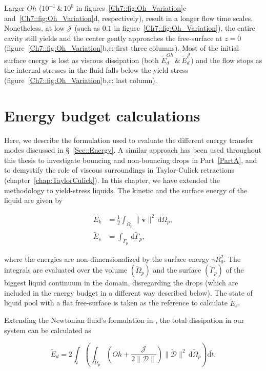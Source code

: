 \begin{subappendices}
Larger $Oh$ ($10^{-1}\,\&\,10^{0}$ in figures~\ref{Ch7::fig:Oh_Variation}c and~\ref{Ch7::fig:Oh_Variation}d, respectively), result in a longer flow time scales.	Nonetheless, at low $\mathcal{J}$ (such as $0.1$ in figure~\ref{Ch7::fig:Oh_Variation}), the entire cavity still yields and the center gently approaches the free-surface at $z = 0$ (figure~\ref{Ch7::fig:Oh_Variation}b,c: first three columns). Most of the initial surface energy is lost as viscous dissipation (both $\tilde E_d^{Oh}\,\&\, \tilde E_d^{\mathcal{J}}$) and the flow stops as the internal stresses in the fluid falls below the yield stress (figure~\ref{Ch7::fig:Oh_Variation}b,c: last column).

\section{Energy budget calculations}\label{App::EnergyBudgetApp}

Here, we describe the formulation used to evaluate the different energy transfer modes discussed in \S~\ref{Sec::Energy}. A similar approach has been used throughout this thesis to investigate bouncing and non-bouncing drops in Part~\ref{PartA}, and to demystify the role of viscous surroundings in Taylor-Culick retractions (chapter~\ref{chap:TaylorCulick}). In this chapter, we have extended the methodology to yield-stress liquids. The kinetic and the surface energy of the liquid are given by

\begin{align}
	\label{Ch7::Eqn::Ek}
	\tilde E_k &= \frac{1}{2}\int_{\tilde \Omega_p}\|\boldsymbol{\tilde v}\|^2\,\mathrm{d}\tilde\Omega_p,\\
	\label{Eqn::Es}
	\tilde E_s &= \int_{\tilde\Gamma_p}\,\mathrm{d}\tilde\Gamma_p,
\end{align}

\noindent where the energies are non-dimensionalized by the surface energy $\gamma R_0^2$. The integrals are evaluated over the volume $\left(\tilde\Omega_p\right)$ and the surface $\left(\tilde\Gamma_p\right)$ of the biggest liquid continuum in the domain, disregarding the drops (which are included in the energy budget in a different way described below). The state of liquid pool with a flat free-surface is taken as the reference to calculate $\tilde E_s$. 

Extending the Newtonian fluid's formulation in \citet[p.~50-51]{landau2013course}, the total dissipation in our system can be calculated as

\begin{equation}\label{Ch7::Eqn::Ed}
	\tilde E_d = 2\int_{\tilde t}\left(\int_{\tilde\Omega_p}\left(Oh + \frac{\mathcal{J}}{2\|\boldsymbol{\mathcal{D}}\|}\right)\|\boldsymbol{\tilde{\mathcal{D}}}\|^2\,\mathrm{d}\tilde\Omega_p\right)\mathrm{d}\tilde t.
\end{equation}


\end{subappendices}
